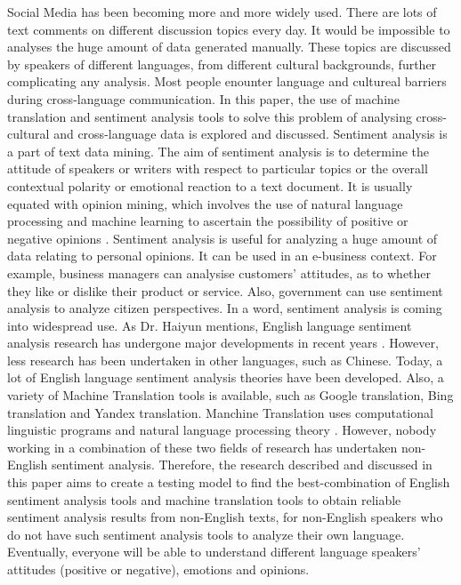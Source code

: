 \documentclass[conference]{IEEEtran}
\begin{document}
Social Media has been becoming more and more widely used. There are lots of text comments
on different discussion topics every day.
It would be impossible to analyses the huge amount of data generated manually.
These topics are discussed by speakers of different languages, from different
cultural backgrounds, further complicating any analysis.
Most people enounter language and cultureal barriers during cross-language
communication.
In this paper, the use of machine translation and sentiment analysis tools to
solve this problem of analysing cross-cultural and cross-language data is
explored and discussed.
Sentiment analysis is a part of text data mining. The aim of sentiment analysis
is to determine the attitude of speakers or writers with respect to particular topics
or the overall contextual polarity or emotional reaction to a text document. It is usually equated with
opinion mining, which involves the use of natural language processing and
machine learning to ascertain the possibility of positive or negative opinions \cite{sentimentAnalysis}.
Sentiment analysis is useful for analyzing a huge amount of data relating to personal
opinions. It can be used in an e-business context. For example, business managers can analysise
customers' attitudes, as to whether they like or dislike their product or service.
Also, government can use sentiment analysis to analyze citizen perspectives.
In a word, sentiment analysis is coming into widespread use.
As Dr. Haiyun mentions, English language sentiment analysis research has
undergone major developments in recent years \cite{ChineseSentimentAnalysis}.
However, less research has been undertaken in other languages, such as Chinese.
Today, a lot of English language sentiment analysis theories have been
developed. Also, a variety of Machine Translation tools is available, such as Google
translation, Bing translation and Yandex translation.
Manchine Translation uses computational linguistic programs and natural language
processing theory \cite{machineTranslation}.
However, nobody working in a combination of these two fields of research has undertaken non-English
sentiment analysis. Therefore, the research described and discussed in this paper aims to create a testing model to find the best-combination of English
sentiment analysis tools and machine translation tools to obtain reliable
sentiment analysis results from non-English texts, for non-English speakers who
do not have such sentiment analysis tools to analyze their own language.
Eventually, everyone will be able to understand different language speakers' attitudes (positive or negative), emotions and opinions.\\
\end{document}
